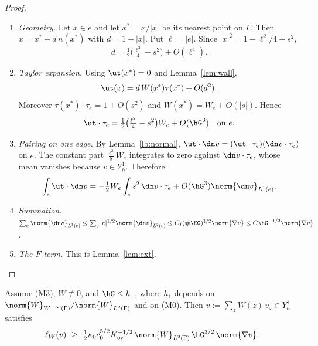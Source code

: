 \begin{proof}
\begin{enumerate}
\item \emph{Geometry.} Let $x\in e$ and let $x^\ast=x/|x|$ be its nearest point on $\Gamma$. Then $x=x^\ast+d\,n(x^\ast)$ with $d=1-|x|$. Put $\ell=|e|$. Since $|x|^2=1-\ell^2/4+s^2$,
\[
d=\tfrac12\bigl(\tfrac{\ell^2}4-s^2\bigr)+O(\ell^4).
\]
\item \emph{Taylor expansion.} Using $\ut(x^\ast)=0$ and Lemma~\ref{lem:wall},
\[
\ut(x)=d\,W(x^\ast)\tau(x^\ast)+O(d^2).
\]
Moreover $\tau(x^\ast)\cdot\tau_e=1+O(s^2)$ and $W(x^\ast)=W_e+O(|s|)$. Hence
\[
\ut\cdot\tau_e=\tfrac12\bigl(\tfrac{\ell^2}{4}-s^2\bigr)W_e+O(\hG^3)\quad\text{on }e .
\]
\item \emph{Pairing on one edge.} By Lemma~\ref{lb:normal}, $\ut\cdot\dn v=(\ut\cdot\tau_e)(\dn v\cdot\tau_e)$ on $e$. The constant part $\frac{\ell^2}{8}W_e$ integrates to zero against $\dn v\cdot\tau_e$, whose mean vanishes because $v\in Y_h^1$. Therefore
\[
\int_e\ut\cdot\dn v=-\tfrac12W_e\int_es^2\,\dn v\cdot\tau_e+O(\hG^3)\norm{\dn v}_{L^1(e)} .
\]
\item \emph{Summation.} $\sum_e\norm{\dn v}_{L^1(e)}\le\sum_e|e|^{1/2}\norm{\dn v}_{L^2(e)}\le C_I(\#\EG)^{1/2}\norm{\nabla v}\le C\hG^{-1/2}\norm{\nabla v}$.
\item \emph{The $F$ term.} This is Lemma~\ref{lem:ext}.\qedhere
\end{enumerate}
\end{proof}

\begin{lemma}\label{lb:assemble}
Assume (M3), $W\not\equiv0$, and $\hG\le h_1$, where $h_1$ depends on $\norm{W}_{W^{1,\infty}(\Gamma)}/\norm{W}_{L^2(\Gamma)}$ and on (M0). Then $v:=\sum_zW(z)\,v_z\in Y_h^1$ satisfies
\[
\ell_W(v)\ \ge\ \tfrac12\kappa_0c_0^{5/2}K_{\mathrm{ov}}^{-1/2}\,\norm{W}_{L^2(\Gamma)}\,\hG^{3/2}\,\norm{\nabla v}.
\]
\end{lemma}

